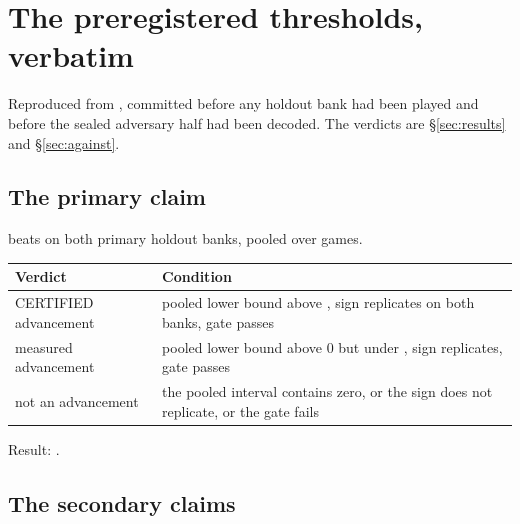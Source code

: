 \section{The preregistered thresholds, verbatim}
\label{app:thresholds}

Reproduced from , committed before any holdout bank had been
played and before the sealed adversary half had been decoded. The verdicts are
\S\ref{sec:results} and \S\ref{sec:against}.

\subsection*{The primary claim}

\frozen{} beats \fcheap{} on both primary holdout banks, pooled over \vsevenBtwoFcheapN{} games.

\begin{center}\small
\begin{tabular}{ll}
\toprule
Verdict & Condition \\
\midrule
CERTIFIED advancement & pooled lower bound above \vsevenPrimaryFloor{}, sign replicates on both banks, gate passes \\
measured advancement & pooled lower bound above 0 but under \vsevenPrimaryFloor{}, sign replicates, gate passes \\
not an advancement & the pooled interval contains zero, or the sign does not replicate, or the gate fails \\
\bottomrule
\end{tabular}
\end{center}

\noindent Result: \textbf{\vsevenPrimaryVerdict{}}.

\subsection*{The secondary claims}

